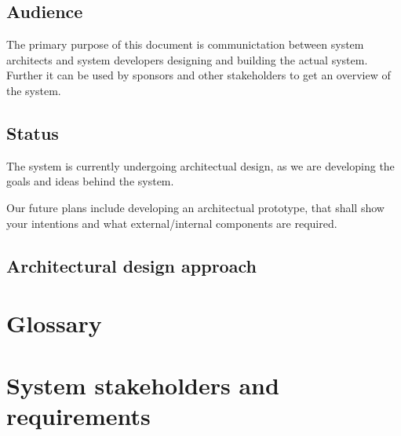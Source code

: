 \documentclass[a4paper,11pt]{report}
\begin{document}
\section{Audience}
\label{sec:audience}
The primary purpose of this document is communictation between system architects
and system developers designing and building the actual system.
Further it can be used by sponsors and other stakeholders to get an overview of
the system.

\section{Status}
\label{sec:status}
The system is currently undergoing architectual design, as we are developing
the goals and ideas behind the system.

Our future plans include developing an architectual prototype, that shall show
your intentions and what external/internal components are required.

\section{Architectural design approach}
\label{sec:arch-design-appr}


\chapter{Glossary}
\label{cha:glossary}
\thispagestyle{fancy}

\chapter{System stakeholders and requirements}
\label{cha:syst-stak-requ}
\thispagestyle{fancy}
\end{document}
